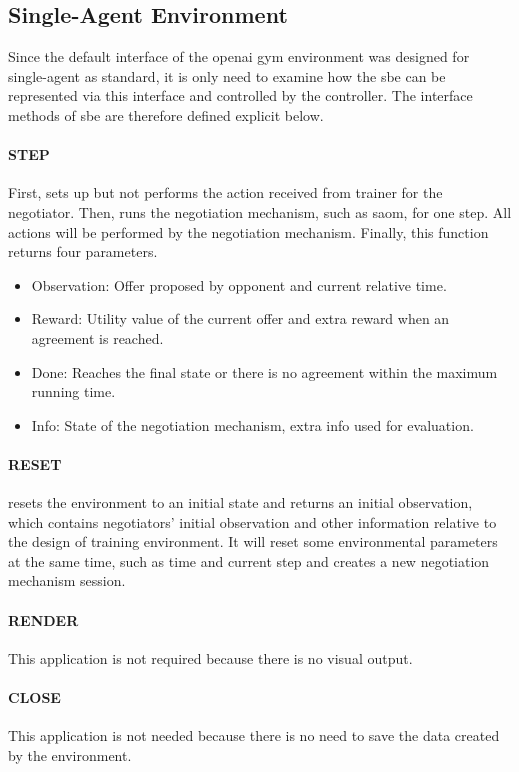 \subsection{Single-Agent Environment} \label{single-agent-env}
Since the default interface of the \gls{openai gym} environment was designed for single-agent as standard, it is only need to examine how the \gls{sbe} can be represented via this interface and controlled by the controller. The interface methods of \gls{sbe} are therefore defined explicit below. 

\paragraph{STEP} First, sets up but not performs the action received from trainer for the negotiator. Then, runs the negotiation mechanism, such as \gls{saom}, for one step. All actions will be performed by the negotiation mechanism. Finally, this function returns four parameters.

\begin{itemize}
	\item Observation: Offer proposed by opponent and current relative time.
	\item Reward: Utility value of the current offer and extra reward when an agreement is reached.
	\item Done: Reaches the final state or there is no agreement within the maximum running time.
	\item Info: State of the negotiation mechanism, extra info used for evaluation.
\end{itemize}

\paragraph{RESET} resets the environment to an initial state and returns an initial observation, which contains negotiators' initial observation and other information relative to the design of training environment. It will reset some environmental parameters at the same time, such as time and current step and creates a new negotiation mechanism session.
\paragraph{RENDER} This application is not required because there is no visual output.
\paragraph{CLOSE}  This application is not needed because there is no need to save the data created by the environment.

